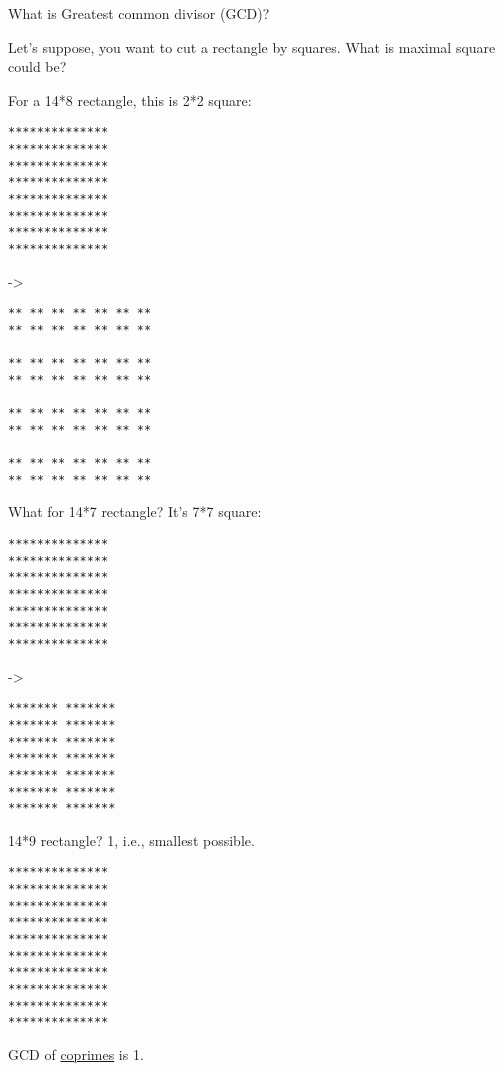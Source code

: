 
What is Greatest common divisor (\ac{GCD})?

Let's suppose, you want to cut a rectangle by squares. What is maximal square could be?

For a 14*8 rectangle, this is 2*2 square:

\begin{lstlisting}
**************
**************
**************
**************
**************
**************
**************
**************
\end{lstlisting}

->

\begin{lstlisting}
** ** ** ** ** ** **
** ** ** ** ** ** **
                  
** ** ** ** ** ** **
** ** ** ** ** ** **
                  
** ** ** ** ** ** **
** ** ** ** ** ** **
                  
** ** ** ** ** ** **
** ** ** ** ** ** **
\end{lstlisting}

What for 14*7 rectangle? It's 7*7 square:

\begin{lstlisting}
**************
**************
**************
**************
**************
**************
**************
\end{lstlisting}

->

\begin{lstlisting}
******* *******
******* *******
******* *******
******* *******
******* *******
******* *******
******* *******
\end{lstlisting}

14*9 rectangle? 1, i.e., smallest possible.

\begin{lstlisting}
**************
**************
**************
**************
**************
**************
**************
**************
**************
**************
\end{lstlisting}


GCD of \href{https://yurichev.com/blog/RSA/}{coprimes} is 1.

\myhrule{}

